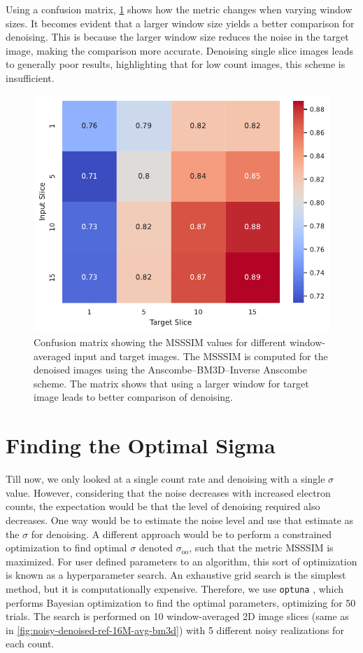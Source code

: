 Using a confusion matrix, \cref{fig:confusion_matrix_msssim_window_avg} shows how the metric changes when varying window sizes. It becomes evident that a larger window size yields a better comparison for denoising. This is because the larger window size reduces the noise in the target image, making the comparison more accurate. Denoising single slice images leads to generally poor results, highlighting that for low count images, this scheme is insufficient.

\begin{figure}[h]
    \centering
    \includegraphics[width=0.5\linewidth]{images/confusion_matrix_msssim_window_avg.pdf}
    \caption{Confusion matrix showing the \gls{MSSSIM} values for different window-averaged input and target images. The \gls{MSSSIM} is computed for the denoised images using the Anscombe--\gls{BM3D}--Inverse Anscombe scheme. The matrix shows that using a larger window for target image leads to better comparison of denoising.}
    \label{fig:confusion_matrix_msssim_window_avg}
\end{figure}

\section{Finding the Optimal Sigma}
Till now, we only looked at a single count rate and denoising with a single $\sigma$ value. However, considering that the noise decreases with increased electron counts, the expectation would be that the level of denoising required also decreases. One way would be to estimate the noise level and use that estimate as the $\sigma$ for denoising. A different approach would be to perform a constrained optimization to find optimal $\sigma$ denoted $\sigma_{\text{oo}}$, such that the metric \gls{MSSSIM} is maximized. For user defined parameters to an algorithm, this sort of optimization is known as a hyperparameter search. An exhaustive grid search is the simplest method, but it is computationally expensive. Therefore, we use \texttt{optuna} \cite{akibaOptunaNextgenerationHyperparameter2019}, which performs Bayesian optimization to find the optimal parameters, optimizing for \num{50} trials. The search is performed on \num{10} window-averaged 2D image slices (same as in \cref{fig:noisy-denoised-ref-16M-avg-bm3d}) with 5 different noisy realizations for each count.


